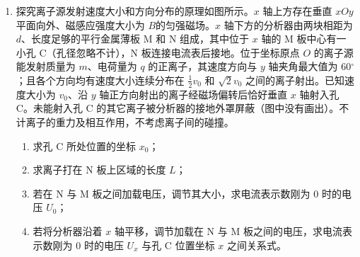 \documentclass[\gkver]{gaokaozhenti}
\begin{document}
\begin{enumerate}
\item
探究离子源发射速度大小和方向分布的原理如图所示。$x$ 轴上方存在垂直 $xOy$ 平面向外、磁感应强度大小为 $B $的匀强磁场。$x$ 轴下方的分析器由两块相距为 $d$、长度足够的平行金属薄板 M 和 N 组成，其中位于 $x$ 轴的 M 板中心有一小孔 C（孔径忽略不计），N 板连接电流表后接地。位于坐标原点 $O$ 的离子源能发射质量为 $m$、电荷量为 $q$ 的正离子，其速度方向与 $y$ 轴夹角最大值为 60${^\circ}$；且各个方向均有速度大小连续分布在 $\frac{1}{2} v_{0}$ 和 $\sqrt 2  v_{0}$ 之间的离子射出。已知速度大小为 $v_{0}$、沿 $y$ 轴正方向射出的离子经磁场偏转后恰好垂直 $x$ 轴射入孔 C。未能射入孔 C 的其它离子被分析器的接地外罩屏蔽（图中没有画出）。不计离子的重力及相互作用，不考虑离子间的碰撞。
\begin{enumerate}
	\item
	求孔 C 所处位置的坐标 $x_{0}$；
	\item
	求离子打在 N 板上区域的长度 $L$；
	\item
	若在 N 与 M 板之间加载电压，调节其大小，求电流表示数刚为 0 时的电压 $U_{0}$；
	\item
	若将分析器沿着 $x$ 轴平移，调节加载在 N 与 M 板之间的电压，求电流表示数刚为 0 时的电压 $U_{x}$ 与孔 C 位置坐标 $x$ 之间关系式。
\end{enumerate}

\end{enumerate}
\end{document}
